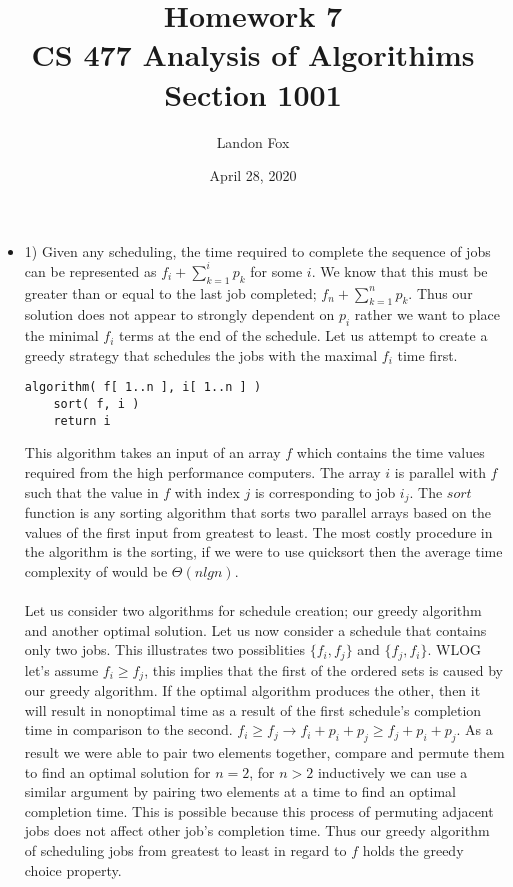 \documentclass[ 12pt ]{article}
\begin{document}
\title{%
	Homework 7 \\
	\large CS 477 Analysis of Algorithims \\
	Section 1001}
\author{Landon Fox}
\date{April 28, 2020}
\maketitle
\newpage

\begin{itemize}
	\item[] {\large 1)}
	Given any scheduling, the time required to complete the sequence of jobs
	can be represented as $f_i + \sum_{k=1}^i p_k$ for some $i$. We know that this
	must be greater than or equal to the last job completed; $f_n + \sum_{k=1}^n p_k$. Thus our
	solution does not appear to strongly dependent on $p_i$ rather we want to place
	the minimal $f_i$ terms at the end of the schedule. Let us attempt to create
	a greedy strategy that schedules the jobs with the maximal $f_i$ time first. \\

	\begin{center}
	\begin{lstlisting}
algorithm( f[ 1..n ], i[ 1..n ] )
	sort( f, i )
	return i
	\end{lstlisting}
	\end{center}

	This algorithm takes an input of an array $f$ which contains the time values
	required from the high performance computers. The array $i$ is parallel with
	$f$ such that the value in $f$ with index $j$ is corresponding to job $i_j$.
	The $sort$ function is any sorting algorithm that sorts two parallel arrays
	based on the values of the first input from greatest to least. The most costly
	procedure in the algorithm is the sorting, if we were to use quicksort then
	the average time complexity of would be $\Theta(nlgn)$. \\ \\

	Let us consider two algorithms for schedule creation; our greedy algorithm
	and another optimal solution. Let us now consider a schedule that contains
	only two jobs. This illustrates two possiblities $\{ f_i, f_j \}$ and
	$\{ f_j, f_i \}$. WLOG let's assume $f_i \geq f_j$, this implies that the
	first of the ordered sets is caused by our greedy algorithm. If the optimal
	algorithm produces the other, then it will result in nonoptimal time as a
	result of the first schedule's completion time in comparison to the second.
	$f_i \geq f_j \rightarrow f_i + p_i + p_j \geq f_j + p_i + p_j$. As a result
	we were able to pair two elements together, compare and permute them to
	find an optimal solution for $n=2$, for $n>2$ inductively we can use a similar
	argument by pairing two elements at a time to find an optimal completion time.
	This is possible because this process of permuting adjacent jobs does not affect
	other job's completion time. Thus our greedy algorithm of scheduling jobs from
	greatest to least in regard to $f$ holds the greedy choice property. \\ \\


\end{itemize}
\end{document}
